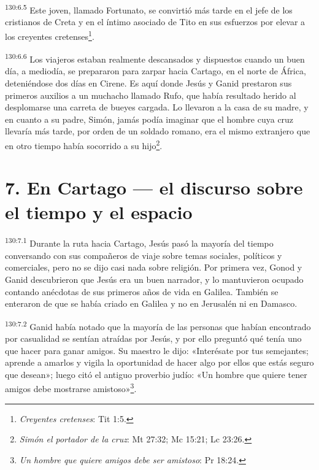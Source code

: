 \par
\textsuperscript{130:6.5} Este joven, llamado Fortunato, se convirtió más tarde en el jefe de los cristianos de Creta y en el íntimo asociado de Tito en sus esfuerzos por elevar a los creyentes cretenses\footnote{\textit{Creyentes cretenses}: Tit 1:5.}.

\par
\textsuperscript{130:6.6} Los viajeros estaban realmente descansados y dispuestos cuando un buen día, a mediodía, se prepararon para zarpar hacia Cartago, en el norte de África, deteniéndose dos días en Cirene. Es aquí donde Jesús y Ganid prestaron sus primeros auxilios a un muchacho llamado Rufo, que había resultado herido al desplomarse una carreta de bueyes cargada. Lo llevaron a la casa de su madre, y en cuanto a su padre, Simón, jamás podía imaginar que el hombre cuya cruz llevaría más tarde, por orden de un soldado romano, era el mismo extranjero que en otro tiempo había socorrido a su hijo\footnote{\textit{Simón el portador de la cruz}: Mt 27:32; Mc 15:21; Lc 23:26.}.

\section*{7. En Cartago --- el discurso sobre el tiempo y el espacio}
\par
\textsuperscript{130:7.1} Durante la ruta hacia Cartago, Jesús pasó la mayoría del tiempo conversando con sus compañeros de viaje sobre temas sociales, políticos y comerciales, pero no se dijo casi nada sobre religión. Por primera vez, Gonod y Ganid descubrieron que Jesús era un buen narrador, y lo mantuvieron ocupado contando anécdotas de sus primeros años de vida en Galilea. También se enteraron de que se había criado en Galilea y no en Jerusalén ni en Damasco.

\par
\textsuperscript{130:7.2} Ganid había notado que la mayoría de las personas que habían encontrado por casualidad se sentían atraídas por Jesús, y por ello preguntó qué tenía uno que hacer para ganar amigos. Su maestro le dijo: «Interésate por tus semejantes; aprende a amarlos y vigila la oportunidad de hacer algo por ellos que estás seguro que desean»; luego citó el antiguo proverbio judío: «Un hombre que quiere tener amigos debe mostrarse amistoso»\footnote{\textit{Un hombre que quiere amigos debe ser amistoso}: Pr 18:24.}.

